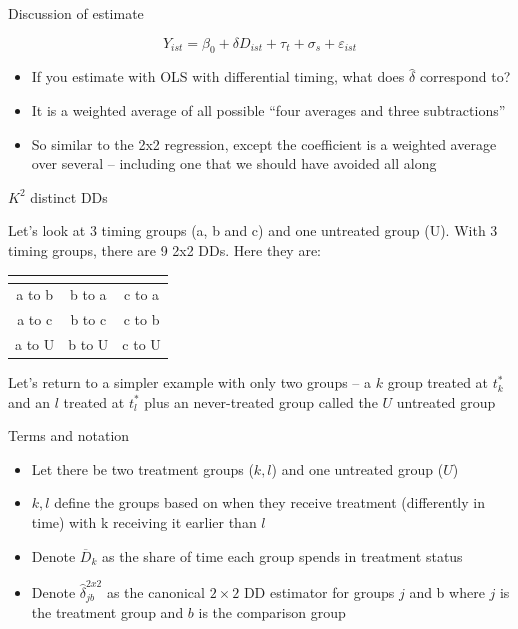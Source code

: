 \documentclass{beamer}
\begin{document}
\begin{frame}{Discussion of estimate}


$$Y_{ist} = \beta_0 + \delta D_{ist} + \tau_t + \sigma_s + \varepsilon_{ist}$$


\begin{itemize}
\item If you estimate with OLS with differential timing, what does $\widehat{\delta}$ correspond to?
\item It is a weighted average of all possible ``four averages and three subtractions'' 
\item So similar to the 2x2 regression, except the coefficient is a weighted average over several -- including one that we should have avoided all along

\end{itemize}

\end{frame}




\begin{frame}{$K^2$ distinct DDs}

Let's look at 3 timing groups (a, b and c) and one untreated group (U).  With 3 timing groups, there are 9 2x2 DDs.  Here they are:


\begin{center}
\begin{tabular}{c|c|c}
\multicolumn{1}{l}{} &
\multicolumn{1}{l}{} &
\multicolumn{1}{l}{} \\
\midrule
a to b & b to a & c to a \\
a to c & b to c & c to b \\
a to U & b to U & c to U \\
\midrule
\end{tabular}
\end{center}

\bigskip

Let's return to a simpler example with only two groups -- a $k$ group treated at $t_k^*$ and an $l$ treated at $t_l^*$ plus an never-treated group called the $U$ untreated group
\end{frame} 


\begin{frame}{Terms and notation}

\begin{itemize}
\item Let there be two treatment groups ($k,l$) and one untreated group ($U$)
\item $k,l$ define the groups based on when they receive treatment (differently in time) with k receiving it earlier than $l$
\item Denote $\overline{D}_k$ as the share of time each group spends in treatment status
\item Denote $\widehat{\delta}_{jb}^{2x2}$ as the canonical $2\times 2$ DD estimator for groups $j$ and b where $j$ is the treatment group and $b$ is the comparison group
\end{itemize}

\end{frame}
\end{document}
